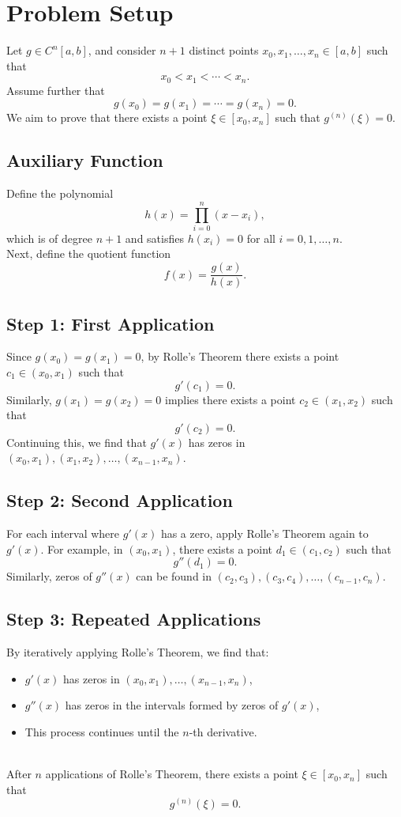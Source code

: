 \documentclass{article}
\begin{document}
\section*{Problem Setup}

Let \(g \in C^n[a, b]\), and consider \(n+1\) distinct points \(x_0, x_1, \ldots, x_n \in [a, b]\) such that 
\[
x_0 < x_1 < \cdots < x_n.
\]
Assume further that
\[
g(x_0) = g(x_1) = \cdots = g(x_n) = 0.
\]
We aim to prove that there exists a point \(\xi \in [x_0, x_n]\) such that \(g^{(n)}(\xi) = 0\).

\subsection*{Auxiliary Function}

Define the polynomial
\[
h(x) = \prod_{i=0}^n (x - x_i),
\]
which is of degree \(n+1\) and satisfies \(h(x_i) = 0\) for all \(i = 0, 1, \ldots, n\). \\Next, define the quotient function
\[
f(x) = \frac{g(x)}{h(x)}.
\]

\subsection*{Step 1: First Application}
Since \(g(x_0) = g(x_1) = 0\), by Rolle’s Theorem there exists a point \(c_1 \in (x_0, x_1)\) such that 
\[
g'(c_1) = 0.
\]
Similarly, \(g(x_1) = g(x_2) = 0\) implies there exists a point \(c_2 \in (x_1, x_2)\) such that 
\[
g'(c_2) = 0.
\]
Continuing this, we find that \(g'(x)\) has zeros in \((x_0, x_1), (x_1, x_2), \ldots, (x_{n-1}, x_n)\).

\subsection*{Step 2: Second Application}
For each interval where \(g'(x)\) has a zero, apply Rolle’s Theorem again to \(g'(x)\). For example, in \((x_0, x_1)\), there exists a point \(d_1 \in (c_1, c_2)\) such that
\[
g''(d_1) = 0.
\]
Similarly, zeros of \(g''(x)\) can be found in \((c_2, c_3), (c_3, c_4), \ldots, (c_{n-1}, c_n)\).

\subsection*{Step 3: Repeated Applications}
By iteratively applying Rolle’s Theorem, we find that:
\begin{itemize}
    \item \(g'(x)\) has zeros in \((x_0, x_1), \ldots, (x_{n-1}, x_n)\),
    \item \(g''(x)\) has zeros in the intervals formed by zeros of \(g'(x)\),
    \item This process continues until the \(n\)-th derivative.\\
\end{itemize}
\\
After \(n\) applications of Rolle’s Theorem, there exists a point \(\xi \in [x_0, x_n]\) such that 
\[
g^{(n)}(\xi) = 0.
\]
\end{document}
